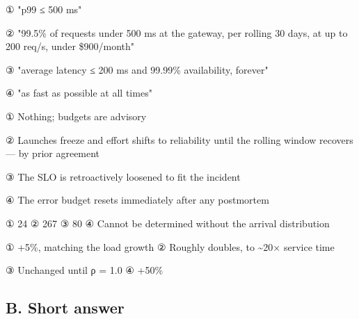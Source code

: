 
\begin{tbboptions}
  \item ① "p99 ≤ 500 ms" 
  \item ② "99.5\% of requests under 500 ms at the gateway, per rolling 30 days, at up to 200 req/s, under \$900/month"
  \item ③ "average latency ≤ 200 ms and 99.99\% availability, forever"
  \item ④ "as fast as possible at all times"
\end{tbboptions}


\begin{tbboptions}
  \item ① Nothing; budgets are advisory
  \item ② Launches freeze and effort shifts to reliability until the rolling window recovers — by prior agreement
  \item ③ The SLO is retroactively loosened to fit the incident
  \item ④ The error budget resets immediately after any postmortem
\end{tbboptions}


\begin{tbboptions}
  \item ① 24        ② 267        ③ 80        ④ Cannot be determined without the arrival distribution
\end{tbboptions}


\begin{tbboptions}
  \item ① +5\%, matching the load growth        ② Roughly doubles, to \textasciitilde{}20× service time
  \item ③ Unchanged until ρ = 1.0        ④ +50\%
\end{tbboptions}

\subsection*{B. Short answer}

